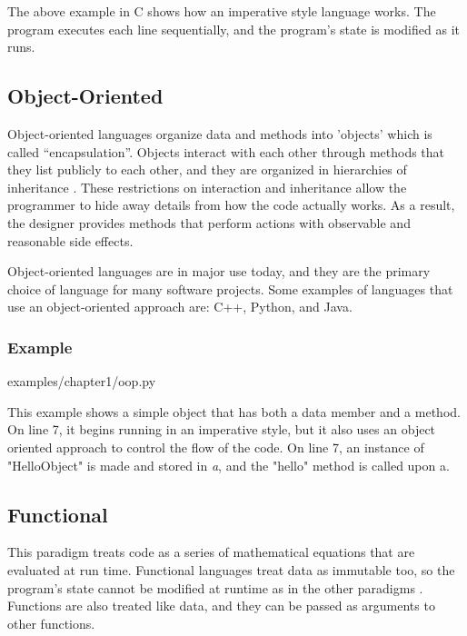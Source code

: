 \documentclass[12pt, oneside, a4paper]{book}
\begin{document}
         The above example in C shows how an imperative style language works.
         The program executes each line sequentially, and the program's state is modified as it runs.

         \subsection{Object-Oriented}
         Object-oriented languages organize data and methods into 'objects' which is called ``encapsulation''.
         Objects interact with each other through methods that they list publicly to each other, and they are organized in hierarchies of inheritance \autocite{normarkOverviewFourMain}.
         These restrictions on interaction and inheritance allow the programmer to hide away details from how the code actually works.
         As a result, the designer provides methods that perform actions with observable and reasonable side effects.

         Object-oriented languages are in major use today, and they are the primary choice of language for many software projects.
         Some examples of languages that use an object-oriented approach are: C++, Python, and Java.

         \subsubsection{Example}
         
         {examples/chapter1/oop.py}

         This example shows a simple object that has both a data member and a method.
         On line 7, it begins running in an imperative style, but it also uses an object oriented approach to control the flow of the code.
         On line 7, an instance of "HelloObject" is made and stored in \textit{a}, and the "hello" method is called upon a.

         \subsection{Functional}
         This paradigm treats code as a series of mathematical equations that are evaluated at run time.
         Functional languages treat data as immutable too, so the program's state cannot be modified at runtime as in the other paradigms \autocite{normarkOverviewFourMain}.
         Functions are also treated like data, and they can be passed as arguments to other functions.
\end{document}
